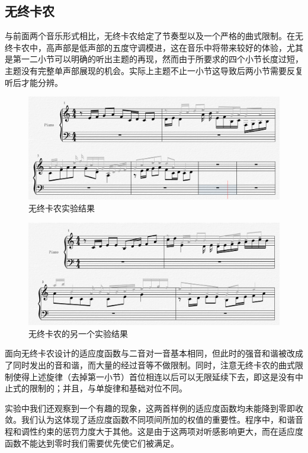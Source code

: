 \documentclass[UTF8,a4paper,10pt]{ctexart}
\begin{document}
    \subsection{无终卡农}
    与前面两个音乐形式相比，无终卡农给定了节奏型以及一个严格的曲式限制。在无终卡农中，高声部是低声部的五度守调模进，这在音乐中将带来较好的体验，尤其是第一二小节可以明确的听出主题的再现，然而由于所要求的四个小节长度过短，主题没有完整单声部展现的机会。实际上主题不止一小节这导致后两小节需要反复听后才能分辨。
    \begin{figure}[H]
        \begin{center}
            \includegraphics[width=1.0\columnwidth]{eg4.PNG}
            \caption{无终卡农实验结果}
        \end{center}
    \end{figure}
    \begin{figure}[H]
        \begin{center}
            \includegraphics[width=1.0\columnwidth]{eg5.PNG}
            \caption{无终卡农的另一个实验结果}
        \end{center}
    \end{figure}
    面向无终卡农设计的适应度函数与二音对一音基本相同，但此时的强音和谐被改成了同时发出的音和谐，而大量的经过音等不做限制。同时，注意无终卡农的曲式限制使得上述旋律（去掉第一小节）首位相连以后可以无限延续下去，即这是没有中止式的限制的；并且，与单旋律和基础对位不同。\par
    实验中我们还观察到一个有趣的现象，这两首样例的适应度函数均未能降到零即收敛。我们认为这体现了适应度函数不同项间所加的权值的重要性。程序中，和谐音程和调性约束的惩罚力度大于其他。这是由于这两项对听感影响更大，而在适应度函数不能达到零时我们需要优先使它们被满足。
\end{document}
